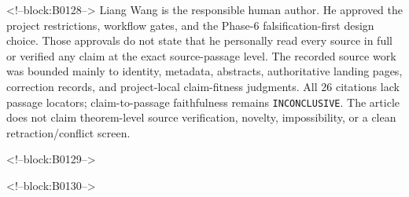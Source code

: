 \documentclass[11pt]{article}
\begin{document}
<!--block:B0128-->
Liang Wang is the responsible human author. He approved the project
restrictions, workflow gates, and the Phase-6 falsification-first design
choice. Those approvals do not state that he personally read every
source in full or verified any claim at the exact source-passage level.
The recorded source work was bounded mainly to identity, metadata,
abstracts, authoritative landing pages, correction records, and
project-local claim-fitness judgments. All 26 citations lack passage
locators; claim-to-passage faithfulness remains \texttt{INCONCLUSIVE}.
The article does not claim theorem-level source verification, novelty,
impossibility, or a clean retraction/conflict screen.

<!--block:B0129-->



<!--block:B0130-->
\end{document}
